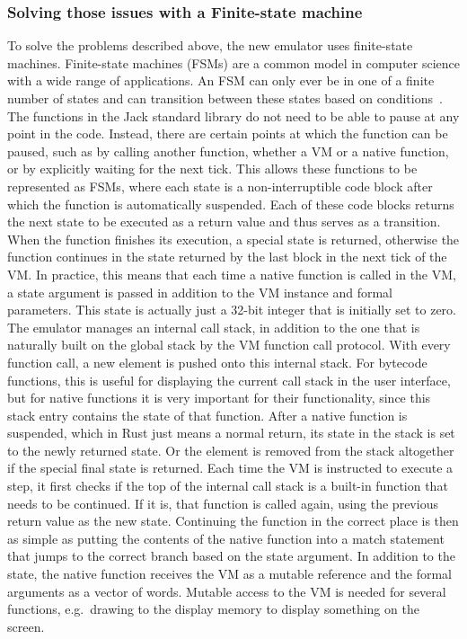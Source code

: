 
\subsubsection{Solving those issues with a Finite-state machine}
To solve the problems described above, the new emulator uses finite-state machines.
Finite-state machines (FSMs) are a common model in computer science with a wide range of applications.
An FSM can only ever be in one of a finite number of states and can transition between these states based on conditions~\cite{sakarovitch2009elements}.
The functions in the Jack standard library do not need to be able to pause at any point in the code.
Instead, there are certain points at which the function can be paused, such as by calling another function, whether a VM or a native function, or by explicitly waiting for the next tick.
This allows these functions to be represented as FSMs, where each state is a non-interruptible code block after which the function is automatically suspended.
Each of these code blocks returns the next state to be executed as a return value and thus serves as a transition.
When the function finishes its execution, a special state is returned, otherwise the function continues in the state returned by the last block in the next tick of the VM.
In practice, this means that each time a native function is called in the VM, a state argument is passed in addition to the VM instance and formal parameters.
This state is actually just a 32-bit integer that is initially set to zero.
The emulator manages an internal call stack, in addition to the one that is naturally built on the global stack by the VM function call protocol.
With every function call, a new element is pushed onto this internal stack.
For bytecode functions, this is useful for displaying the current call stack in the user interface, but for native functions it is very important for their functionality, since this stack entry contains the state of that function.
After a native function is suspended, which in Rust just means a normal return, its state in the stack is set to the newly returned state.
Or the element is removed from the stack altogether if the special final state is returned.
Each time the VM is instructed to execute a step, it first checks if the top of the internal call stack is a built-in function that needs to be continued.
If it is, that function is called again, using the previous return value as the new state.
Continuing the function in the correct place is then as simple as putting the contents of the native function into a match statement that jumps to the correct branch based on the state argument.
In addition to the state, the native function receives the VM as a mutable reference and the formal arguments as a vector of words.
Mutable access to the VM is needed for several functions, e.g.\ drawing to the display memory to display something on the screen.

